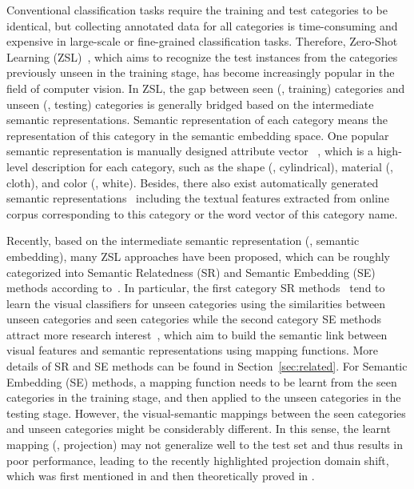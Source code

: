 \documentclass[journal]{IEEEtran}
\begin{document}
Conventional classification tasks require the training and test categories to be identical, but collecting annotated data for all categories is time-consuming and expensive in large-scale or fine-grained classification tasks. Therefore, Zero-Shot Learning (ZSL)~\cite{lampert2014attribute,guo2017zero,luo2018zero}, which aims to recognize the test instances from the categories previously unseen in the training stage, has become increasingly popular in the field of computer vision. In ZSL, the gap between seen (\ie, training) categories and unseen (\ie, testing) categories is generally bridged based on the intermediate semantic representations. Semantic representation of each category means the representation of this category in the semantic embedding space. One popular semantic representation is manually designed attribute vector ~\cite{lampert2014attribute,farhadi2009describing}, which is a high-level description for each category, such as the shape (\eg, cylindrical), material (\eg, cloth), and color (\eg, white). Besides, there also exist automatically generated semantic representations~\cite{akata2015evaluation, frome2013devise, socher2013zero, yu2013designing} including the textual features extracted from online corpus corresponding to this category or the word vector of this category name.  

Recently, based on the intermediate semantic representation (\ie, semantic embedding), many ZSL approaches have been proposed, which can be roughly categorized into Semantic Relatedness (SR) and Semantic Embedding (SE) methods according to~\cite{fu2015zero,li2015max}. In particular, the first category SR methods~\cite{mensink2014costa,norouzi2013zero,zhang2015zero} tend to learn the visual classifiers for unseen categories using the similarities between unseen categories and seen categories while the second category SE methods attract more research interest~\cite{lampert2014attribute, bucher2016improving, xu2017transductive, jayaraman2014decorrelating,kodirov2017semantic,kodirov2015unsupervised,
shojaee2016semi,frome2013devise, fu2014transductive, li2015semi, xian2016latent, zhang2016zerose, akata2015evaluation, li2015max, romera2015embarrassingly, guo2016transductive, long2016attribute, al2016recovering}, which aim to build the semantic link between visual features and semantic representations using mapping functions. More details of SR and SE methods can be found in Section~\ref{sec:related}. For Semantic Embedding (SE) methods, a mapping function needs to be learnt from the seen categories in the training stage, and then applied to the unseen categories in the testing stage. However, the visual-semantic mappings between the seen categories and unseen categories might be considerably different. In this sense, the learnt mapping (\ie, projection) may not generalize well to the test set and thus results in poor performance, leading to the recently highlighted projection domain shift, which was first mentioned in \cite{fu2014transductive} and then theoretically proved in \cite{romera2015embarrassingly}. 
\end{document}

